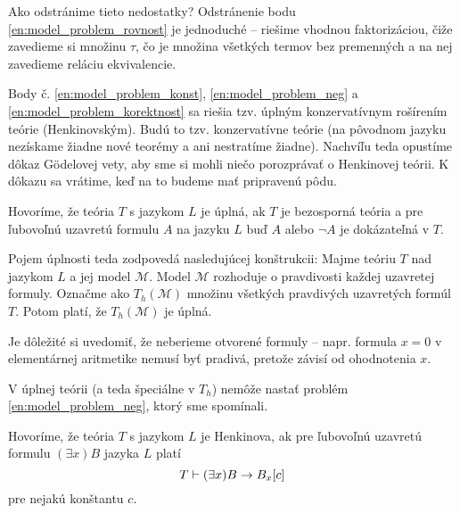 \begin{dokaz}
    Ako odstránime tieto nedostatky?
    Odstránenie bodu \ref{en:model_problem_rovnost} je jednoduché --
    riešime vhodnou faktorizáciou, čiže zavedieme si množinu $\tau$,
    čo je množina všetkých termov bez premenných
    a na nej zavedieme reláciu ekvivalencie.

    Body č. \ref{en:model_problem_konst}, \ref{en:model_problem_neg} a 
    \ref{en:model_problem_korektnost} sa riešia tzv.
    úplným konzervatívnym rošírením teórie (Henkinovským).
    Budú to tzv.  konzervatívne teórie (na pôvodnom jazyku
    nezískame žiadne nové teorémy a ani nestratíme žiadne).
    Nachvíľu teda opustíme dôkaz G\"odelovej vety, aby sme si mohli niečo
    porozprávať o Henkinovej teórii. K dôkazu sa vrátime, keď na to budeme
    mať pripravenú pôdu.
    \\
\end{dokaz}

\begin{definicia}
    Hovoríme, že teória $T$ s jazykom $L$ je úplná, ak $T$ je
    bezosporná teória a pre ľubovoľnú uzavretú formulu $A$ na jazyku
    $L$ buď $A$ alebo $\neg A$ je dokázateľná v $T$.
\end{definicia}

\begin{poznamka}
    Pojem úplnosti teda zodpovedá nasledujúcej konštrukcii:
    Majme teóriu $T$ nad jazykom $L$ a jej model $\mathcal{M}$.
    Model $\mathcal{M}$ rozhoduje o pravdivosti každej uzavretej
    formuly.
    Označme ako $T_h(\mathcal{M})$ množinu všetkých
    pravdivých uzavretých formúl $T$.
    Potom platí, že $T_h(\mathcal{M})$ je úplná.

    Je dôležité si uvedomiť, že neberieme otvorené formuly --
    napr. formula $x=0$ v elementárnej aritmetike nemusí byť pradivá, 
    pretože závisí od ohodnotenia $x$.
\end{poznamka}

\begin{poznamka}
    V úplnej teórii (a teda špeciálne v $T_h$) nemôže nastať problém 
    \ref{en:model_problem_neg}, ktorý sme spomínali.
\end{poznamka}

\begin{definicia}
    Hovoríme, že teória $T$ s jazykom $L$ je Henkinova, ak pre
    ľubovoľnú uzavretú formulu $(\exists x)B$ jazyka $L$ platí
    \begin{equation*}
        T \vdash (\exists x)B \rightarrow B_x[c]
    \end{equation*}
    pre nejakú konštantu $c$.
\end{definicia}

